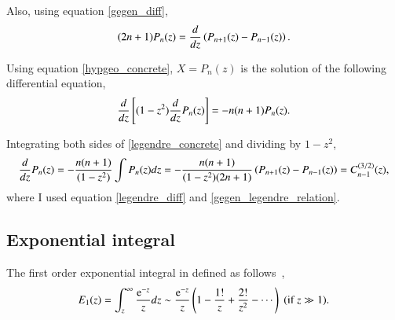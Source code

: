 \documentclass{article}
\begin{document}
Also, using equation \eqref{gegen_diff},
\begin{equation}
 (2n+1)P_n(z) = \frac{d {}}{d {z}} \left( P_{n+1} (z) - P_{n-1} (z) \right).\label{legendre_diff}
\end{equation}

Using equation \eqref{hypgeo_concrete}, $X = P_n(z)$ is the solution of the following differential equation,
\begin{equation}
 \frac{d {}}{d {z}} \left[ (1-z^2) \frac{d {}}{d {z}} P_n(z) \right] = - n(n+1)P_n(z).\label{legendre_concrete}
\end{equation}

Integrating both sides of \eqref{legendre_concrete} and dividing by $1-z^2$,
\begin{align}
 \frac{d {}}{d {z}} P_n(z) = -\frac{n(n+1)}{(1 - z^2)} \int P_n(z) dz = -\frac{n(n+1)}{(1-z^2) (2n+1)} \left(P_{n+1} (z) - P_{n-1}(z)\right) = C^{(3/2)}_{n-1} (z),\label{ledgendre_diff_to_gegen}
\end{align}
where I used equation \eqref{legendre_diff} and \eqref{gegen_legendre_relation}.

\subsection{Exponential integral}
The first order exponential integral in defined as follows~\cite{olver2010nist},
\begin{equation}
 E_1(z) = \int_{z}^{\infty} \frac{\mathrm{e}^{-z}}{z} dz \sim \frac{\mathrm{e}^{-z}}{z} \left( 1 - \frac{1!}{z} + \frac{2!}{z^2} - \cdots \right) \; (\text{if } z \gg 1 ).
\end{equation}
\end{document}
